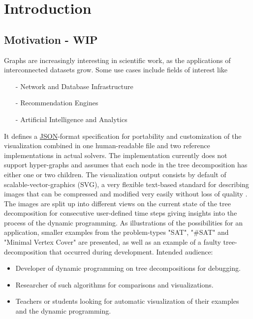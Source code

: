 \documentclass[a4paper, 12pt, bibliography=totoc]{scrartcl}
\begin{document}
\newpage
\tableofcontents

\newpage


\section{Introduction}
\subsection{Motivation - WIP}
Graphs are increasingly interesting in scientific work, as the applications of interconnected datasets grow.
Some use cases include fields of interest like %
\begin{itemize}
	\item[-] Network and Database Infrastructure
	\item[-] Recommendation Engines
	\item[-] Artificial Intelligence and Analytics
\end{itemize}
It defines a \href{https://www.json.org/json-en.html}{JSON}-format specification for portability and customization of the visualization combined in one human-readable file and two reference implementations in actual solvers.
The implementation currently does not support hyper-graphs and assumes that each node in the tree decomposition has either one or two children.
The visualization output consists by default of scalable-vector-graphics (SVG), a very flexible text-based standard for describing images that can be compressed and modified very easily without loss of quality  \cite{SVGMozilla} .
The images are split up into different views on the current state of the tree decomposition for consecutive user-defined time steps giving insights into the process of the dynamic programming.
As illustrations of the possibilities for an application, smaller examples from the problem-types "SAT", "\#SAT" and "Minimal Vertex Cover" are presented,
as well as an example of a faulty tree-decomposition that occurred during development.
Intended audience: 
\begin{itemize}
	\item Developer of dynamic programming on tree decompositions for debugging.
	\item Researcher of such algorithms for comparisons and visualizations.
	\item Teachers or students looking for automatic visualization of their examples and the dynamic programming.
\end{itemize} 
\end{document}
